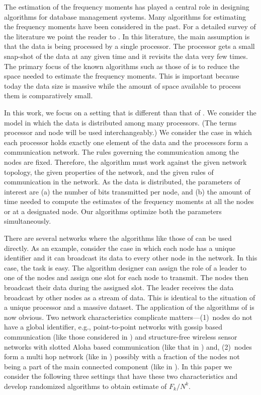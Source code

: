 \documentclass[10pt,twosided,a4paper,draft,onecolumn]{article}
\begin{document}
The estimation of the frequency moments has played a central role in
designing algorithms for database management systems. Many algorithms
for estimating the frequency moments have been considered in the
past. For a detailed survey of the literature we point the reader to
\cite{NelsonThesis11}. In this literature, the main assumption is that
the data is being processed by a single processor. The processor gets
a small snap-shot of the data at any given time and it revisits the
data very few times. The primary focus of the known algorithms such as
those of \cite{Alon96,Ganguly04,Coppersmith04} is to reduce the space
needed to estimate the frequency moments. This is important because
today the data size is massive while
the amount of space available to process them is comparatively small.

In this work, we focus on a setting that is different than that of
\cite{Alon96,Ganguly04,Coppersmith04}. We consider the model in which
the data is distributed among many processors. (The terms processor
and node will be used interchangeably.) We consider the case
in which each processor holds exactly one element of the data and the
processors form a communication network. The rules governing the
communication among the nodes are fixed. Therefore, the algorithm must
work against the given network topology, the given properties of the
network, and the given rules of communication in the network. As the
data is distributed, the parameters of interest are (a) the number of
bits transmitted per node, and (b) the amount of time needed to
compute the estimates of the frequency moments at all the nodes or at
a designated node. Our algorithms optimize both the parameters
simultaneously.

There are several networks where the algorithms like those of
\cite{Alon96,Ganguly04,Coppersmith04} can be used directly. As an
example, consider the case in which each node has a unique identifier
and it can broadcast its data to every other node in the network. In
this case, the task is easy. The algorithm designer can assign the
role of a leader to one of the nodes and assign one slot for each node
to transmit. The nodes then broadcast their data during the assigned
slot. The leader receives the data broadcast by other nodes as a
stream of data. This is identical to the situation of a unique
processor and a massive dataset. The application of the algorithms of \cite{Alon96,Ganguly04,Coppersmith04}
is now obvious. Two network characteristics
complicate matters---(1)~nodes do not have a global identifier, e.g.,
point-to-point networks with gossip based communication (like those considered in
\cite{Boyd05,Mosk-Aoyama06}) and structure-free wireless sensor
networks with slotted Aloha based communication (like that in
\cite{Kamath08}) and, (2)~nodes form a multi hop network (like in
\cite{Boyd05,Mosk-Aoyama06, Kamath08}) possibly with a fraction of the
nodes not being a part of the main connected component (like in
\cite{Iyer11}). In this paper we consider the following three settings
that have these two characteristics and develop randomized algorithms
to obtain estimate of $F_k/N^k.$
\end{document}
